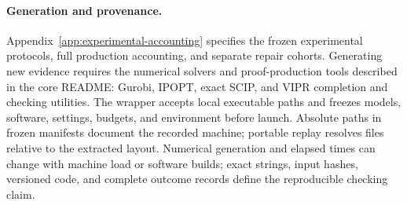 \paragraph{Generation and provenance.}
Appendix~\ref{app:experimental-accounting} specifies the frozen experimental protocols, full production accounting, and separate repair cohorts. Generating new evidence requires the numerical solvers and proof-production tools described in the core README: Gurobi, IPOPT, exact SCIP, and VIPR completion and checking utilities. The wrapper accepts local executable paths and freezes models, software, settings, budgets, and environment before launch. Absolute paths in frozen manifests document the recorded machine; portable replay resolves files relative to the extracted layout. Numerical generation and elapsed times can change with machine load or software builds; exact strings, input hashes, versioned code, and complete outcome records define the reproducible checking claim.
